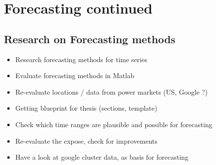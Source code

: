 \documentclass[a4paper]{article}
\begin{document}
\vspace{1em}

\hfill\date{Week 18, from 05.05. to 11.05.}

\section{Forecasting continued}

\subsection{Research on Forecasting methods}

\begin{itemize}

\item Research forecasting methods for time series

\item Evaluate forecasting methods in Matlab

\item Re-evaluate locations / data from power markets (US, Google ?)

\item Getting blueprint for thesis (sections, template)

\item Check which time ranges are plausible and possible for forecasting

\item Re-evaluate the expose, check for improvements

\item Have a look at google cluster data, as basis for forecasting

\end{itemize}
\end{document}
